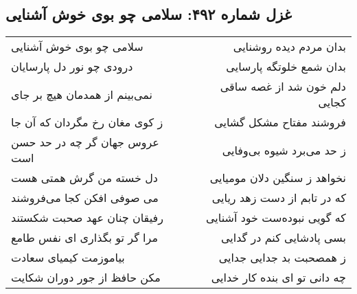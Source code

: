 \begin{center}
\section*{غزل شماره ۴۹۲: سلامی چو بوی خوش آشنایی}
\label{sec:sh492}
\begin{longtable}{l p{0.5cm} r}
سلامی چو بوی خوش آشنایی
&&
بدان مردم دیده روشنایی
\\
درودی چو نور دل پارسایان
&&
بدان شمع خلوتگه پارسایی
\\
نمی‌بینم از همدمان هیچ بر جای
&&
دلم خون شد از غصه ساقی کجایی
\\
ز کوی مغان رخ مگردان که آن جا
&&
فروشند مفتاح مشکل گشایی
\\
عروس جهان گر چه در حد حسن است
&&
ز حد می‌برد شیوه بی‌وفایی
\\
دل خسته من گرش همتی هست
&&
نخواهد ز سنگین دلان مومیایی
\\
می صوفی افکن کجا می‌فروشند
&&
که در تابم از دست زهد ریایی
\\
رفیقان چنان عهد صحبت شکستند
&&
که گویی نبوده‌ست خود آشنایی
\\
مرا گر تو بگذاری ای نفس طامع
&&
بسی پادشایی کنم در گدایی
\\
بیاموزمت کیمیای سعادت
&&
ز همصحبت بد جدایی جدایی
\\
مکن حافظ از جور دوران شکایت
&&
چه دانی تو ای بنده کار خدایی
\\
\end{longtable}
\end{center}
